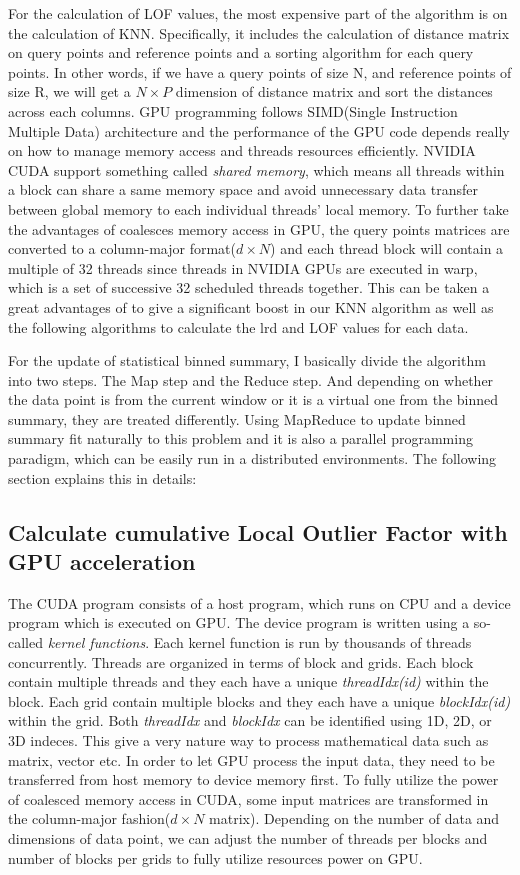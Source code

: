 \documentclass[11pt]{article}       %
\begin{document}
For the calculation of LOF values, the most expensive part of the algorithm is on the calculation of KNN. Specifically, it includes the calculation of distance matrix on query points and reference points and a sorting algorithm for each query points. In other words, if we have a query points of size N, and reference points of size R, we will get a $N \times P$ dimension of distance matrix and sort the distances across each columns. GPU programming follows SIMD(Single Instruction Multiple Data) architecture and the performance of the GPU code depends really on how to manage memory access and threads resources efficiently. NVIDIA CUDA support something called \textit{shared memory}, which means all threads within a block can share a same memory space and avoid unnecessary data transfer between global memory to each individual threads' local memory. To further take the advantages of coalesces memory access in GPU, the query points matrices are converted to a column-major format($d \times N$) and each thread block will contain a multiple of 32 threads since threads in NVIDIA GPUs are executed in warp, which is a set of successive 32 scheduled threads together. This can be taken a great advantages of to give a significant boost in our KNN algorithm as well as the following algorithms to calculate the lrd and LOF values for each data. 

For the update of statistical binned summary, I basically divide the algorithm into two steps. The Map step and the Reduce step. And depending on whether the data point is from the current window or it is a virtual one from the binned summary, they are treated differently. Using MapReduce to update binned summary fit naturally to this problem and it is also a parallel programming paradigm, which can be easily run in a distributed environments. The following section explains this in details:

\subsection{Calculate cumulative Local Outlier Factor with GPU acceleration}

The CUDA program consists of a host program, which runs on CPU and a device program which is executed on GPU. The device program is written using a so-called \textit{kernel functions}. Each kernel function is run by thousands of threads concurrently. Threads are organized in terms of block and grids. Each block contain multiple threads and they each have a unique \textit{threadIdx(id)} within the block. Each grid contain multiple blocks and they each have a unique \textit{blockIdx(id)} within the grid. Both \textit{threadIdx} and \textit{blockIdx} can be identified using 1D, 2D, or 3D indeces. This give a very nature way to process mathematical data such as matrix, vector etc. In order to let GPU process the input data, they need to be transferred from host memory to device memory first. To fully utilize the power of coalesced memory access in CUDA, some input matrices are transformed in the column-major fashion($d \times N$ matrix). Depending on the number of data and dimensions of data point, we can adjust the number of threads per blocks and number of blocks per grids to fully utilize resources power on GPU. 
\end{document}
